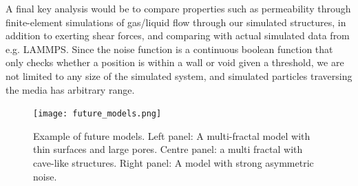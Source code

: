 \documentclass[aps,pre,twocolumn,letterpaper,floatfix,showpacs]{revtex4}
\begin{document}
A final key analysis would be to compare properties such as permeability through finite-element
simulations of gas/liquid flow through our simulated structures, in addition to exerting shear forces,
and comparing with actual simulated data from e.g. LAMMPS. 
Since the noise function is a continuous boolean function that only checks whether a position is
within a wall or void given a threshold, we are not limited to any size of the simulated system, and simulated particles traversing the media has arbitrary range.  



\begin{figure}
\texttt{[image: future\_models.png]}
\caption{Example of future models. Left panel: A multi-fractal model with thin surfaces and large pores. Centre panel: a multi fractal with cave-like structures. Right panel: A model with strong asymmetric noise. }
\label{fig:future_models}
\end{figure}


\end{document}
